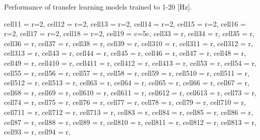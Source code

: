 \documentclass[journal]{IEEEtran}
\begin{document}
\begin{table}
\caption{Performance of transfer learning models trained to 1-20 [Hz].}
\centering
\begin{adjustbox}{width=\textwidth}
\begin{tblr}{
  cell{1}{1} = {r=2}{}, cell{1}{2} = {r=2}{}, cell{1}{3} = {r=2}{}, cell{1}{4} = {r=2}{}, cell{1}{5} = {r=2}{}, cell{1}{6} = {r=2}{}, cell{1}{7} = {r=2}{}, cell{1}{8} = {r=2}{}, cell{1}{9} = {c=5}{c}, cell{3}{3} = {r}, cell{3}{4} = {r}, cell{3}{5} = {r}, cell{3}{6} = {r}, cell{3}{7} = {r}, cell{3}{8} = {r}, cell{3}{9} = {r}, cell{3}{10} = {r}, cell{3}{11} = {r}, cell{3}{12} = {r}, cell{3}{13} = {r}, cell{4}{3} = {r}, cell{4}{4} = {r}, cell{4}{5} = {r}, cell{4}{6} = {r}, cell{4}{7} = {r}, cell{4}{8} = {r}, cell{4}{9} = {r}, cell{4}{10} = {r}, cell{4}{11} = {r}, cell{4}{12} = {r}, cell{4}{13} = {r}, cell{5}{3} = {r}, cell{5}{4} = {r}, cell{5}{5} = {r}, cell{5}{6} = {r}, cell{5}{7} = {r}, cell{5}{8} = {r}, cell{5}{9} = {r}, cell{5}{10} = {r}, cell{5}{11} = {r}, cell{5}{12} = {r}, cell{5}{13} = {r}, cell{6}{3} = {r}, cell{6}{4} = {r}, cell{6}{5} = {r}, cell{6}{6} = {r}, cell{6}{7} = {r}, cell{6}{8} = {r}, cell{6}{9} = {r}, cell{6}{10} = {r}, cell{6}{11} = {r}, cell{6}{12} = {r}, cell{6}{13} = {r}, cell{7}{3} = {r}, cell{7}{4} = {r}, cell{7}{5} = {r}, cell{7}{6} = {r}, cell{7}{7} = {r}, cell{7}{8} = {r}, cell{7}{9} = {r}, cell{7}{10} = {r}, cell{7}{11} = {r}, cell{7}{12} = {r}, cell{7}{13} = {r}, cell{8}{3} = {r}, cell{8}{4} = {r}, cell{8}{5} = {r}, cell{8}{6} = {r}, cell{8}{7} = {r}, cell{8}{8} = {r}, cell{8}{9} = {r}, cell{8}{10} = {r}, cell{8}{11} = {r}, cell{8}{12} = {r}, cell{8}{13} = {r}, cell{9}{3} = {r}, cell{9}{4} = {r},
}
\end{tblr}
\end{adjustbox}
\end{table}
\end{document}
